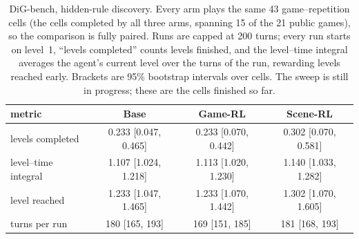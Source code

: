 \begin{table}[t]
\centering\small
\caption{DiG-bench, hidden-rule discovery. Every arm plays the same 43 game--repetition cells (the cells completed by all three arms, spanning 15 of the 21 public games), so the comparison is fully paired. Runs are capped at 200 turns; every run starts on level~1, ``levels completed'' counts levels finished, and the level--time integral averages the agent's current level over the turns of the run, rewarding levels reached early. Brackets are 95\% bootstrap intervals over cells. The sweep is still in progress; these are the cells finished so far.}
\label{tab:dig}
\begin{tabular}{@{}lccc@{}}
\toprule
metric & Base & Game-RL & Scene-RL \\
\midrule
levels completed & 0.233 [0.047, 0.465] & 0.233 [0.070, 0.442] & 0.302 [0.070, 0.581] \\
level--time integral & 1.107 [1.024, 1.218] & 1.113 [1.020, 1.230] & 1.140 [1.033, 1.282] \\
level reached & 1.233 [1.047, 1.465] & 1.233 [1.070, 1.442] & 1.302 [1.070, 1.605] \\
turns per run & 180 [165, 193] & 169 [151, 185] & 181 [168, 193] \\
\bottomrule
\end{tabular}
\end{table}
